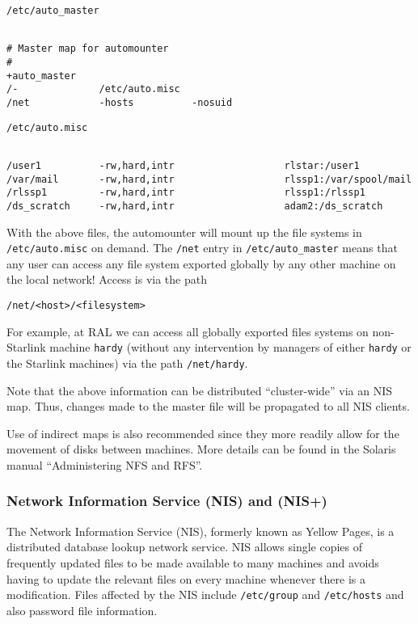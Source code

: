 \verb+/etc/auto_master+

\begin{verbatim}

# Master map for automounter
#
+auto_master
/-              /etc/auto.misc
/net            -hosts          -nosuid

\end{verbatim}

\verb+/etc/auto.misc+

\begin{verbatim}

/user1          -rw,hard,intr                   rlstar:/user1
/var/mail       -rw,hard,intr                   rlssp1:/var/spool/mail
/rlssp1         -rw,hard,intr                   rlssp1:/rlssp1
/ds_scratch     -rw,hard,intr                   adam2:/ds_scratch

\end{verbatim}

With the above files, the automounter will mount up the file systems
in \verb+/etc/auto.misc+ on demand. The {\tt /net} entry in \verb+/etc/auto_master+
means that any user can access any file system exported globally by any
other machine on the local network! Access is via the path

\verb+/net/<host>/<filesystem>+

For example, at RAL we can access all globally exported files systems
on non-Starlink machine \verb+hardy+ (without any intervention by
managers of either \verb+hardy+ or the Starlink machines) via
the path \verb+/net/hardy+.

Note that the above information can be distributed ``cluster-wide'' via an
NIS map. Thus, changes made to the master file will be propagated to all
NIS clients.

Use of indirect maps is also recommended since they more readily allow for
the movement of disks between machines. More details can be found in the
Solaris manual ``Administering NFS and RFS''.


\subsubsection{Network Information Service (NIS) and (NIS+)}

The Network Information Service (NIS), formerly known as Yellow Pages, is a
distributed database lookup network service. NIS allows single copies of
frequently updated files to be made available to many machines and avoids
having to update the relevant files on every machine whenever there is a
modification. Files affected by the NIS include {\tt /etc/group} and
{\tt /etc/hosts} and also password file information.

